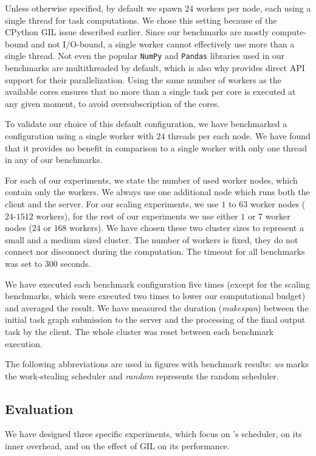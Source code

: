 Unless otherwise specified, by default we spawn $24$ \dask{}
workers per node, each using a single thread for task computations. We chose this setting because
of the CPython GIL issue described earlier. Since our benchmarks are mostly compute-bound and not
I/O-bound, a single worker cannot effectively use more than a single thread. Not even the popular
\texttt{NumPy} and \texttt{Pandas} libraries used in our benchmarks are
multithreaded by default, which is also why \dask{} provides direct API support for
their parallelization. Using the same number of workers as the available cores ensures
that no more than a single task per core is executed at any given moment, to avoid oversubscription
of the cores.

To validate our choice of this default configuration, we have benchmarked a configuration using a
single worker with $24$ threads per each node. We have found that it provides no
benefit in comparison to a single worker with only one thread in any of our benchmarks.

For each of our experiments, we state the number of used worker nodes, which contain only the
workers. We always use one additional node which runs both the client and the server. For our
scaling experiments, we use $1$ to $63$ worker nodes
($24$-$1512$ \dask{} workers), for the rest of
our experiments we use either $1$ or $7$ worker nodes
($24$ or $168$ \dask{} workers). We have chosen
these two cluster sizes to represent a small and a medium sized \dask{} cluster.
The number of workers is fixed, they do not connect nor disconnect during the computation. The
timeout for all benchmarks was set to $300$ seconds.

We have executed each benchmark configuration five times (except for the scaling benchmarks, which
were executed two times to lower our computational budget) and averaged the result. We have
measured the duration (\emph{makespan}) between the initial task graph submission to the
server and the processing of the final output task by the client. The whole cluster was reset
between each benchmark execution.

The following abbreviations are used in figures with benchmark results: \emph{ws}
marks the work-stealing scheduler and \emph{random} represents the random scheduler.


\subsection*{Evaluation}
We have designed three specific experiments, which focus on \dask{}'s scheduler, on
its inner overhead, and on the effect of GIL on its performance.

